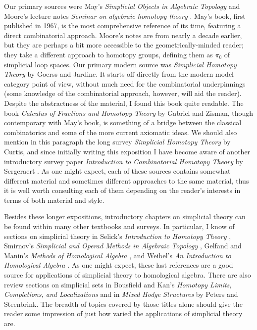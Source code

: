 \documentclass[12pt]{article}
\theoremstyle{plain}
\theoremstyle{definition}
\begin{document}
Our primary sources were May's \emph{Simplicial Objects in Algebraic Topology} \cite{MAY67} and Moore's lecture notes \emph{Seminar on algebraic homotopy theory} \cite{MOORE}. May's book, first published in 1967, is the most comprehensive reference of its time, featuring a direct combinatorial approach. Moore's notes are from nearly a decade earlier, but they are perhaps a bit more accessible to the geometrically-minded reader; they take a different approach to homotopy groups, defining them as $\pi_0$ of simplicial loop spaces. Our primary modern source was \emph{Simplicial Homotopy Theory} \cite{GoeJar} by Goerss and Jardine. It starts off directly from the modern model category point of view, without much need for the combinatorial underpinnings (some knowledge of the combinatorial approach, however, will aid the reader). Despite the abstractness of the material, I found this book quite readable. The book \emph{Calculus of Fractions and Homotopy Theory} \cite{GabZis} by Gabriel and Zisman, though contemporary with May's book, is something of a bridge between the classical combinatorics and some of the more current axiomatic ideas. We should also mention in this paragraph the long survey \emph{Simplicial Homotopy Theory} \cite{Cu71} by Curtis, and since initially writing this exposition I have become aware of another introductory survey paper \emph{Introduction to Combinatorial Homotopy Theory} by Sergeraert \cite{Ser08}. 
As one might expect, each of these sources contains somewhat different material and sometimes different approaches to the same material, thus it is well worth consulting each of them depending on the reader's interests  in terms of both  material and style.

Besides these longer expositions,  introductory chapters on simplicial theory can be found within many other textbooks and surveys. In particular, I know of sections on simplicial theory 
in Selick's \emph{Introduction to Homotopy Theory} \cite{SELICK},
Smirnov's \emph{Simplicial and Operad Methods in Algebraic Topology} \cite{SMIRNOV}, Gelfand and Manin's \emph{Methods of Homological Algebra} \cite{GelMan2}, and Weibel's \emph{An Introduction to Homological Algebra} \cite{WEIB}. As one might expect, these last references are a good source for applications of simplicial theory to homological algebra.  There are also  review sections on simplicial sets in Bousfield and Kan's \emph{Homotopy Limits, Completions, and Localizations} \cite{BouKan} and in \emph{Mixed Hodge Structures} \cite{PetSte} by Peters and Steenbrink.
The breadth of topics covered by those titles alone should give the reader some impression of just how varied the applications of simplicial theory are.
\end{document}
